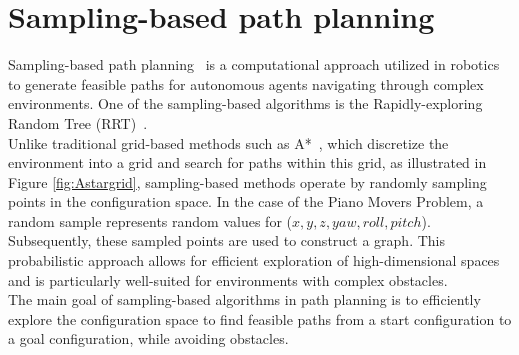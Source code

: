 \documentclass{ctuthesis}
\begin{document}
\section{Sampling-based path planning}
Sampling-based path planning~\cite{Lavalle2006PlanningAlgos} is a computational approach utilized in robotics to generate feasible paths for autonomous agents navigating through complex environments. 
One of the sampling-based algorithms is the Rapidly-exploring Random Tree (RRT)~\cite{lavalle1998rapidly}.\\[12pt]
Unlike traditional grid-based methods such as A*~\cite{Hart1968Astar}, 
which discretize the environment into a grid and search for paths within this grid, as illustrated in Figure \ref{fig:Astargrid}, 
sampling-based methods operate by randomly sampling points in the configuration space.
In the case of the Piano Movers Problem, a random sample represents random values for ($x, y, z, yaw, roll, pitch$).
Subsequently, these sampled points are used to construct a graph.
This probabilistic approach allows for efficient exploration of high-dimensional spaces and is particularly well-suited for environments with complex obstacles.\\[12pt]
The main goal of sampling-based algorithms in path planning is to efficiently explore the configuration space to find feasible paths from a start configuration to a goal configuration, 
while avoiding obstacles.
\end{document}
